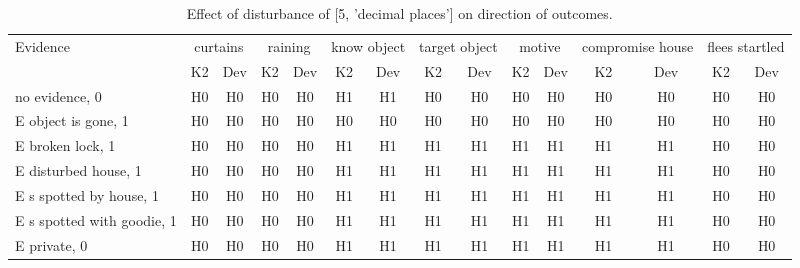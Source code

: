 \begin{table}\begin{tabular}{l|cc|cc|cc|cc|cc|cc|cc}\toprule\multirow{2}{*}{Evidence} & \multicolumn{2}{c}{curtains}& \multicolumn{2}{c}{raining}& \multicolumn{2}{c}{know object}& \multicolumn{2}{c}{target object}& \multicolumn{2}{c}{motive}& \multicolumn{2}{c}{compromise house}& \multicolumn{2}{c}{flees startled}\\& {K2} & {Dev}& {K2} & {Dev}& {K2} & {Dev}& {K2} & {Dev}& {K2} & {Dev}& {K2} & {Dev}& {K2} & {Dev}\\\midrule
no evidence, 0 & H0&H0&H0&H0&H1&H1&H0&H0&H0&H0&H0&H0&H0&H0\\E object is gone, 1 & H0&H0&H0&H0&H0&H0&H0&H0&H0&H0&H0&H0&H0&H0\\E broken lock, 1 & H0&H0&H0&H0&H1&H1&H1&H1&H1&H1&H1&H1&H0&H0\\E disturbed house, 1 & H0&H0&H0&H0&H1&H1&H1&H1&H1&H1&H1&H1&H0&H0\\E s spotted by house, 1 & H0&H0&H0&H0&H1&H1&H1&H1&H1&H1&H1&H1&H0&H0\\E s spotted with goodie, 1 & H0&H0&H0&H0&H1&H1&H1&H1&H1&H1&H1&H1&H0&H0\\E private, 0 & H0&H0&H0&H0&H1&H1&H1&H1&H1&H1&H1&H1&H0&H0\\\bottomrule\end{tabular}\caption{Effect of disturbance of [5, 'decimal places'] on direction of outcomes.}\end{table}